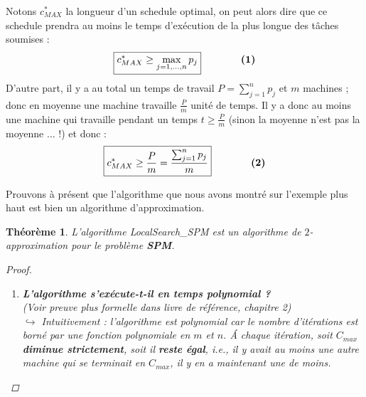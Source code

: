 \documentclass[12pt]{article}
\newcommand{\titre}[1]{\textcolor{title}{#1}}
\newtheorem{thm}{Th\'eor\`eme}[section]
\newtheorem{proof}{Preuve}[section]
\begin{document}
Notons $c^*_{MAX}$ la longueur d'un schedule optimal, on peut alors dire que ce schedule prendra au moins le temps d'exécution de la plus
longue des tâches soumises :
$$\boxed{c^*_{MAX} \geq \max_{j=1,\ldots,n} p_j} \qquad\qquad \text{\textbf{(1)}}$$
D'autre part, il y a au total un temps de travail $P = \sum_{j=1}^n p_j$ et $m$ machines ; donc en
moyenne une machine travaille $\frac{P}{m}$ unité de temps. Il y a donc au moins
une machine qui travaille pendant un temps $t \geq \frac{P}{m}$ (sinon la moyenne n'est pas la moyenne $\ldots$ !) et donc :
$$\boxed{c^*_{MAX} \geq \frac{P}{m} = \frac{\sum_{j=1}^n p_j}{m}} \qquad\qquad \text{\textbf{(2)}}$$

Prouvons à présent que l'algorithme que nous avons montré sur l'exemple plus haut est bien un algorithme d'approximation.

\begin{thm}L'algorithme LocalSearch\_SPM est un algorithme de $2$-approximation pour le problème \textbf{\titre{SPM}}.
\begin{proof}$ $\\
\begin{enumerate}
\item \textbf{L'algorithme s'exécute-t-il en temps polynomial ?}\\ (Voir preuve plus formelle dans livre de référence, chapitre 2) \\
$\hookrightarrow$ Intuitivement : l'algorithme est polynomial car le nombre d'itérations est borné par une fonction polynomiale en $m$ et $n$.
\'A chaque itération, soit $C_{max}$ \textbf{diminue strictement}, soit il
\textbf{reste égal}, i.e., il y avait au moins une autre machine qui se terminait en
$C_{max}$, il y en a maintenant une de moins.
\begin{figure}[H]
    \begin{center}

\end{center}
\end{figure}
\end{enumerate}
\end{proof}
\end{thm}
\end{document}
